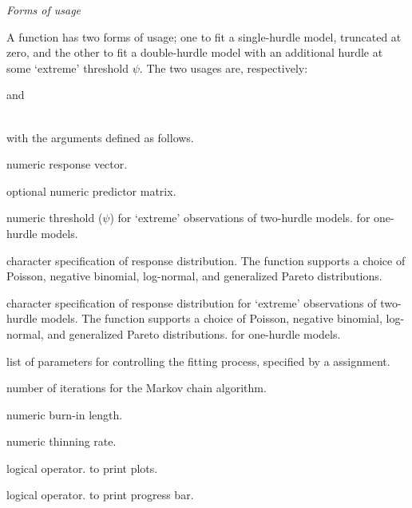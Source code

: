 \documentclass[article]{jss}
\begin{document}
{\large \textit{Forms of usage}}

A  function has two forms of usage; one to fit a single-hurdle model, truncated at zero, and the other to fit a double-hurdle model with an additional hurdle at some `extreme' threshold $\psi$. The two usages are, respectively:


and

 \\ 

with the arguments defined as follows.

\begin{description}[labelindent = 1.5cm, leftmargin = 1.5cm]
	
	\item [\code{y}] numeric response vector.
	\item [\code{x}] optional numeric predictor matrix.
	\item [\code{hurdle}] numeric threshold ($\psi$) for `extreme' observations of two-hurdle models.  for one-hurdle models.
	\item [\code{dist}] character specification of response distribution. The function supports a choice of Poisson, negative binomial, log-normal, and generalized Pareto distributions.
	\item [\code{dist.2}] character specification of response distribution for `extreme' observations of two-hurdle models. The function supports a choice of Poisson, negative binomial, log-normal, and generalized Pareto distributions.  for one-hurdle models.
	\item [\code{control}] list of parameters for controlling the fitting process, specified by a  assignment.
	\item [\code{iters}] number of iterations for the Markov chain algorithm. 
	\item [\code{burn}] numeric burn-in length.
	\item [\code{nthin}] numeric thinning rate.
	\item [\code{plots}] logical operator.  to print plots. 
	\item [\code{progress.bar}] logical operator.  to print progress bar. 

\end{description}
\end{document}
